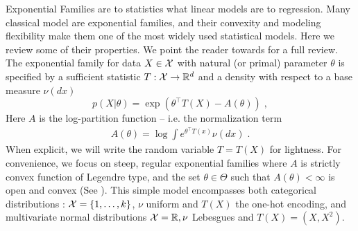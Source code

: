 \documentclass[twoside]{article}
\newcommand{\logpart}{A}
\newcommand{\nat}{\theta}
\begin{document}
Exponential Families are to statistics what linear models are to regression.
Many classical model are exponential families, and their convexity and modeling flexibility make them one of the most widely used statistical models. 
Here we review some of their properties. 
We point the reader towards \citet[Chapter 3]{wainwright2008graphical} for a full review.
The exponential family for data $X\in {\mathcal X}$ with natural (or primal) parameter $\nat$  is specified by a sufficient statistic $T: {\mathcal X} \rightarrow \mathbb{R}^d$ and a density with respect to a base measure $\nu(dx)$
\begin{equation}
	 p(X|\nat) = \exp( \nat^\top T(X) - \logpart(\nat)) \; ,
\end{equation}
Here $\logpart$ is the log-partition function -- i.e. the normalization term
\begin{align}
    \logpart(\nat) = \log \int e^{\nat^\top T(x)} \nu(dx) \; .
\end{align}
When explicit, we will write the random variable $T = T(X)$ for lightness.
For convenience, we focus on steep, regular exponential families 
where $\logpart$ is strictly convex function of Legendre type,
and the set $\nat \in \Theta$ such that $\logpart(\nat) < \infty$ is open and convex
(See \citet{barndoffnielsen2014information}).
This simple model encompasses both categorical distributions : ${\mathcal X} = \{1, \dots, k\}$, $\nu$ uniform and $T(X)$  the one-hot encoding, and multivariate normal distributions ${\mathcal X}=\mathbb{R}, \nu$ Lebesgues and $T(X)=(X, X^2)$. 

\end{document}
